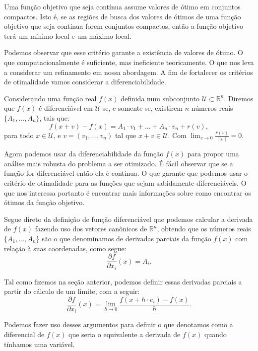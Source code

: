 \begin{theorem}
  Uma função objetivo que seja contínua assume valores de ótimo em conjuntos compactos. Isto é, se as regiões de busca dos valores de ótimos de uma função objetivo que seja contínua forem conjuntos compactos, então a função objetivo terá um mínimo local e um máximo local. 
\end{theorem}


\par Podemos observar que esse critério garante a existência de valores de ótimo. O que computacionalmente é suficiente, mas ineficiente teoricamente. O que nos leva a considerar um refinamento em nossa abordagem. A fim de fortalecer os critérios de otimalidade vamos considerar a diferenciabilidade. 

\begin{definition}
  Considerando uma função real $f(x)$ definida num subconjunto $\mathcal{U} \subset \mathbb{R}^n$. Diremos que $f(x)$ é diferenciável em $\mathcal{U}$ se, e somente se, existirem $n$ números reais $\{A_1, ..., A_n\}$, tais que:
  $$ f(x+v)- f(x)= A_1 \cdot v_1 + ... + A_n \cdot v_n + r(v),$$ 
  para todo $x \in \mathcal{U}$, e $v = (v_1, ..., v_n)$ tal que $x+v \in \mathcal{U}$. Com $\lim_{v\rightarrow 0} \frac{r(v)}{||v||}=0$.
\end{definition}

\par Agora podemos usar da diferenciabilidade da função $f(x)$ para propor uma análise mais robusta do problema a ser otimizado. É fácil observar que se a função for diferenciável então ela é contínua. O que garante que podemos usar o critério de otimalidade para as funções que sejam sabidamente diferenciáveis. O que nos interessa portanto é encontrar mais informações sobre como encontrar os ótimos da função objetivo.

\par Segue direto da definição de função diferenciável que podemos calcular a derivada de $f(x)$ fazendo uso dos vetores canônicos de $\mathbb{R}^n$, obtendo que os números reais $\{A_1, ..., A_n\}$ são o que denominamos de derivadas parciais da função $f(x)$ com relação à suas coordenadas, como segue:
$$\frac{\partial f}{\partial x_i}(x) = A_i.$$
\par Tal como fizemos na seção anterior, podemos definir essas derivadas parciais a partir do cálculo de um limite, com a seguir:
$$\frac{\partial f}{\partial x_i}(x) = \lim_{h \rightarrow 0}\frac{f(x+h \cdot e_i) - f(x)}{h}.$$
\par Podemos fazer uso desses argumentos para definir o que denotamos como a diferencial de $f(x)$ que seria o equivalente a derivada de $f(x)$ quando tínhamos uma variável. 

